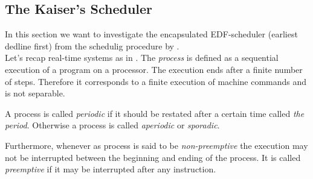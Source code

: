 \subsection{The Kaiser's Scheduler}









In this section we want to investigate the encapsulated EDF-scheduler (earliest dedline first) from the schedulig procedure by \cite{K}. \\

Let's recap \glspl{real-time system} as in \cite{KBK}.
The {\itshape process} is defined as a sequential execution of a program on a processor. 
The execution ends after a finite number of steps. 
Therefore it corresponds to a finite execution of machine commands and is not separable.\\
\begin{definition}
	A process is called {\itshape periodic} if it should be restated after a certain time called {\itshape the period}. 
	Otherwise a process is called {\itshape aperiodic} or {\itshape sporadic}.


Furthermore, whenever as process is said to be {\itshape non-preemptive} the execution may not be interrupted between the beginning and ending of the process. 
It is called {\itshape preemptive} if it may be interrupted after any instruction.
\end{definition}  
 
